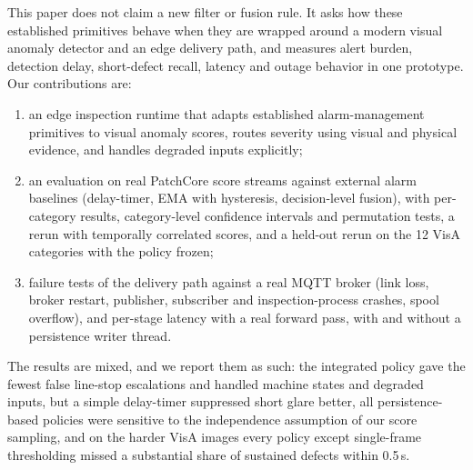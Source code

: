 \documentclass[conference]{IEEEtran}
\begin{document}
This paper does not claim a new filter or fusion rule. It asks how these established primitives behave when they are wrapped around a modern visual anomaly detector and an edge delivery path, and measures alert burden, detection delay, short-defect recall, latency and outage behavior in one prototype. Our contributions are:
\begin{enumerate}
\item an edge inspection runtime that adapts established alarm-management primitives to visual anomaly scores, routes severity using visual and physical evidence, and handles degraded inputs explicitly;
\item an evaluation on real PatchCore score streams against \NumExternal{} external alarm baselines (delay-timer, EMA with hysteresis, decision-level fusion), with per-category results, category-level confidence intervals and permutation tests, a rerun with temporally correlated scores, and a held-out rerun on the 12 VisA categories with the policy frozen;
\item failure tests of the delivery path against a real MQTT broker (link loss, broker restart, publisher, subscriber and inspection-process crashes, spool overflow), and per-stage latency with a real forward pass, with and without a persistence writer thread.
\end{enumerate}
The results are mixed, and we report them as such: the integrated policy gave the fewest false line-stop escalations and handled machine states and degraded inputs, but a simple delay-timer suppressed short glare better, all persistence-based policies were sensitive to the independence assumption of our score sampling, and on the harder VisA images every policy except single-frame thresholding missed a substantial share of sustained defects within 0.5\,s.
\end{document}
